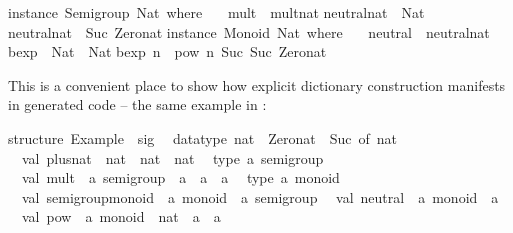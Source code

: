 \begin{isabellebody}
\begin{isamarkuptext}
\isanewline
instance\ Semigroup\ Nat\ where\ {\isacharbraceleft}\isanewline
\ \ mult\ {\isacharequal}\ mult{\isacharunderscore}nat{\isacharsemicolon}\isanewline
{\isacharbraceright}{\isacharsemicolon}\isanewline
\isanewline
neutral{\isacharunderscore}nat\ {\isacharcolon}{\isacharcolon}\ Nat{\isacharsemicolon}\isanewline
neutral{\isacharunderscore}nat\ {\isacharequal}\ Suc\ Zero{\isacharunderscore}nat{\isacharsemicolon}\isanewline
\isanewline
instance\ Monoid\ Nat\ where\ {\isacharbraceleft}\isanewline
\ \ neutral\ {\isacharequal}\ neutral{\isacharunderscore}nat{\isacharsemicolon}\isanewline
{\isacharbraceright}{\isacharsemicolon}\isanewline
\isanewline
bexp\ {\isacharcolon}{\isacharcolon}\ Nat\ {\isacharminus}{\isachargreater}\ Nat{\isacharsemicolon}\isanewline
bexp\ n\ {\isacharequal}\ pow\ n\ {\isacharparenleft}Suc\ {\isacharparenleft}Suc\ Zero{\isacharunderscore}nat{\isacharparenright}{\isacharparenright}{\isacharsemicolon}\isanewline
\isanewline
{\isacharbraceright}\isanewline%
\end{isamarkuptext}%
\isamarkuptrue%
%
\endisatagtypewriter
{\isafoldtypewriter}%
%
\isadelimtypewriter
%
\endisadelimtypewriter
%
\begin{isamarkuptext}%
\noindent This is a convenient place to show how explicit dictionary
  construction manifests in generated code -- the same example in
  :%
\end{isamarkuptext}%
\isamarkuptrue%
%
\isadelimtypewriter
%
\endisadelimtypewriter
%
\isatagtypewriter
%
\begin{isamarkuptext}%
structure\ Example\ {\isacharcolon}\ sig\isanewline
\ \ datatype\ nat\ {\isacharequal}\ Zero{\isacharunderscore}nat\ {\isacharbar}\ Suc\ of\ nat\isanewline
\ \ val\ plus{\isacharunderscore}nat\ {\isacharcolon}\ nat\ {\isacharminus}{\isachargreater}\ nat\ {\isacharminus}{\isachargreater}\ nat\isanewline
\ \ type\ {\isacharprime}a\ semigroup\isanewline
\ \ val\ mult\ {\isacharcolon}\ {\isacharprime}a\ semigroup\ {\isacharminus}{\isachargreater}\ {\isacharprime}a\ {\isacharminus}{\isachargreater}\ {\isacharprime}a\ {\isacharminus}{\isachargreater}\ {\isacharprime}a\isanewline
\ \ type\ {\isacharprime}a\ monoid\isanewline
\ \ val\ semigroup{\isacharunderscore}monoid\ {\isacharcolon}\ {\isacharprime}a\ monoid\ {\isacharminus}{\isachargreater}\ {\isacharprime}a\ semigroup\isanewline
\ \ val\ neutral\ {\isacharcolon}\ {\isacharprime}a\ monoid\ {\isacharminus}{\isachargreater}\ {\isacharprime}a\isanewline
\ \ val\ pow\ {\isacharcolon}\ {\isacharprime}a\ monoid\ {\isacharminus}{\isachargreater}\ nat\ {\isacharminus}{\isachargreater}\ {\isacharprime}a\ {\isacharminus}{\isachargreater}\ {\isacharprime}a\isanewline

\end{isamarkuptext}
\end{isabellebody}
